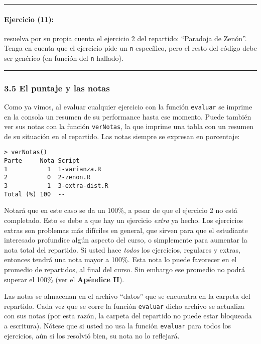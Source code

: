 \documentclass[]{article}
\begin{document}
\begin{center}\rule{3in}{0.4pt}\end{center}

\paragraph{Ejercicio (11):}

resuelva por su propia cuenta el ejercicio 2 del repartido: ``Paradoja
de Zenón''. Tenga en cuenta que el ejercicio pide un \texttt{n}
específico, pero el resto del código debe ser genérico (en función del
\texttt{n} hallado).

\begin{center}\rule{3in}{0.4pt}\end{center}

\subsubsection{3.5 El puntaje y las notas}

Como ya vimos, al evaluar cualquier ejercicio con la función
\texttt{evaluar} se imprime en la consola un resumen de su performance
hasta ese momento. Puede también ver sus notas con la función
\texttt{verNotas}, la que imprime una tabla con un resumen de su
situación en el repartido. Las notas siempre se expresan en porcentaje:

\begin{verbatim}
> verNotas()
Parte     Nota Script        
1           1  1-varianza.R  
2           0  2-zenon.R     
3           1  3-extra-dist.R
Total (%) 100  --       
\end{verbatim}
Notará que en este caso se da un 100\%, a pesar de que el ejercicio 2 no
está completado. Esto se debe a que hay un ejercicio \emph{extra} ya
hecho. Los ejercicios extras son problemas más difíciles en general, que
sirven para que el estudiante interesado profundice algún aspecto del
curso, o simplemente para aumentar la nota total del repartido. Si usted
hace \emph{todos} los ejercicios, regulares y extras, entonces tendrá
una nota mayor a 100\%. Esta nota lo puede favorecer en el promedio de
repartidos, al final del curso. Sin embargo ese promedio no podrá
superar el 100\% (ver el \textbf{Apéndice II}).

Las notas se almacenan en el archivo ``datos'' que se encuentra en la
carpeta del repartido. Cada vez que se corre la función \texttt{evaluar}
dicho archivo se actualiza con sus notas (por esta razón, la carpeta del
repartido no puede estar bloqueada a escritura). Nótese que si usted no
usa la función \texttt{evaluar} para todos los ejercicios, aún si los
resolvió bien, su nota no lo reflejará.
\end{document}
